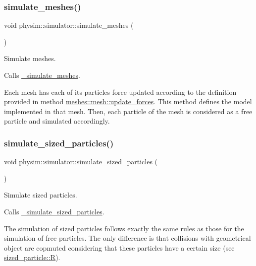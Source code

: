 \subsubsection{\texorpdfstring{simulate\+\_\+meshes()}{simulate\_meshes()}}
{\footnotesize\ttfamily void physim\+::simulator\+::simulate\+\_\+meshes (\begin{DoxyParamCaption}{ }\end{DoxyParamCaption})}



Simulate meshes. 

Calls \hyperlink{classphysim_1_1simulator_ac598aa9b36e01c8cee937a8f95719cd8}{\+\_\+simulate\+\_\+meshes}.

Each mesh has each of its particle\textquotesingle{}s force updated according to the definition provided in method \hyperlink{classphysim_1_1meshes_1_1mesh_ad7cad4cd454cce562c8c404ef09f8bd3}{meshes\+::mesh\+::update\+\_\+forces}. This method defines the model implemented in that mesh. Then, each particle of the mesh is considered as a free particle and simulated accordingly. \mbox{\label{classphysim_1_1simulator_ac99a02f99b4f83501478093d402abea5}} 
\subsubsection{\texorpdfstring{simulate\+\_\+sized\+\_\+particles()}{simulate\_sized\_particles()}}
{\footnotesize\ttfamily void physim\+::simulator\+::simulate\+\_\+sized\+\_\+particles (\begin{DoxyParamCaption}{ }\end{DoxyParamCaption})}



Simulate sized particles. 

Calls \hyperlink{classphysim_1_1simulator_a04922992cda3b1c402da7041324c6049}{\+\_\+simulate\+\_\+sized\+\_\+particles}.

The simulation of sized particles follows exactly the same rules as those for the simulation of free particles. The only difference is that collisions with geometrical object are copmuted considering that these particles have a certain size (see \hyperlink{classphysim_1_1particles_1_1sized__particle_ac67d5df84b91bb12152c8691dd43e98c}{sized\+\_\+particle\+::R}).

